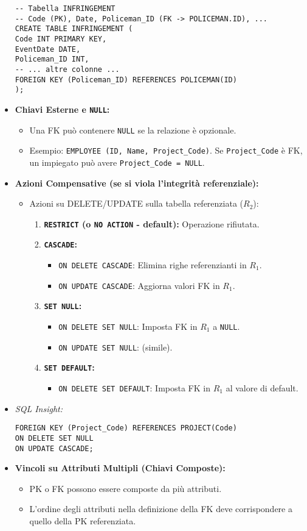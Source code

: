 \documentclass{article}
\begin{document}
\begin{itemize}
\begin{verbatim}
-- Tabella INFRINGEMENT
-- Code (PK), Date, Policeman_ID (FK -> POLICEMAN.ID), ...
CREATE TABLE INFRINGEMENT (
Code INT PRIMARY KEY,
EventDate DATE,
Policeman_ID INT,
-- ... altre colonne ...
FOREIGN KEY (Policeman_ID) REFERENCES POLICEMAN(ID)
);
		\end{verbatim}
		\item \textbf{Chiavi Esterne e \texttt{NULL}:}
		\begin{itemize}
			\item Una FK può contenere \texttt{NULL} se la relazione è opzionale.
			\item Esempio: \texttt{EMPLOYEE (ID, Name, Project\_Code)}. Se \texttt{Project\_Code} è FK, un impiegato può avere \texttt{Project\_Code = NULL}.
		\end{itemize}
		\item \textbf{Azioni Compensative (se si viola l'integrità referenziale):}
		\begin{itemize}
			\item Azioni su DELETE/UPDATE sulla tabella referenziata ($R_2$):
			\begin{enumerate}
				\item \textbf{\texttt{RESTRICT} (o \texttt{NO ACTION} - default):} Operazione rifiutata.
				\item \textbf{\texttt{CASCADE}:}
				\begin{itemize}
					\item \texttt{ON DELETE CASCADE}: Elimina righe referenzianti in $R_1$.
					\item \texttt{ON UPDATE CASCADE}: Aggiorna valori FK in $R_1$.
				\end{itemize}
				\item \textbf{\texttt{SET NULL}:}
				\begin{itemize}
					\item \texttt{ON DELETE SET NULL}: Imposta FK in $R_1$ a \texttt{NULL}.
					\item \texttt{ON UPDATE SET NULL}: (simile).
				\end{itemize}
				\item \textbf{\texttt{SET DEFAULT}:}
				\begin{itemize}
					\item \texttt{ON DELETE SET DEFAULT}: Imposta FK in $R_1$ al valore di default.
				\end{itemize}
			\end{enumerate}
		\end{itemize}
		\item \textit{SQL Insight:}
		\begin{verbatim}
FOREIGN KEY (Project_Code) REFERENCES PROJECT(Code)
ON DELETE SET NULL
ON UPDATE CASCADE;
		\end{verbatim}
		\item \textbf{Vincoli su Attributi Multipli (Chiavi Composte):}
		\begin{itemize}
			\item PK o FK possono essere composte da più attributi.
			\item L'ordine degli attributi nella definizione della FK deve corrispondere a quello della PK referenziata.
		\end{itemize}
	\end{itemize}
	
\end{document}
